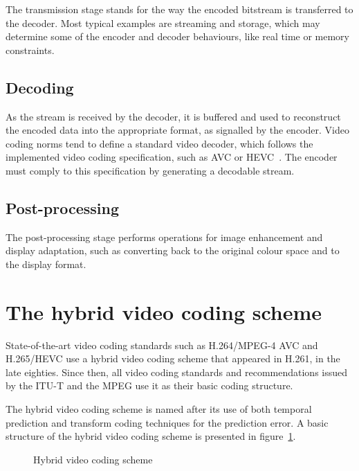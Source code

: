\documentclass[11pt,a4paper,openright,twoside]{book}
\numberwithin{equation}{section} %
\begin{document}
The transmission stage stands for the way the encoded bitstream is
transferred to the decoder.
Most typical examples are streaming and storage, which may determine
some of the encoder and decoder behaviours, like real time or memory
constraints.

\subsection{Decoding}
\label{sub:decoding}

As the stream is received by the decoder, it is buffered and used to
reconstruct the encoded data into the appropriate format, as signalled
by the encoder.
Video coding norms tend to define a standard video decoder, which
follows the implemented video coding specification, such as \ac{AVC}
or \ac{HEVC}~\cite{itu-14-h265-hevc-rec,sullivan-12-overview-hevc}.
The encoder must comply to this specification by generating a decodable
stream.

\subsection{Post-processing}
\label{sub:post_processing}

The post-processing stage performs operations for image enhancement and
display adaptation, such as converting back to the original colour
space and to the display format.

\section{The hybrid video coding scheme}
\label{sec:the_hybrid_video_coding_scheme}

State-of-the-art video coding standards such as H.264/\acs{MPEG}-4 \acs{AVC}
and H.265/\acs{HEVC} use a hybrid video coding scheme that appeared in
H.261, in the late eighties.
Since then, all video coding standards and recommendations issued by the
\ac{ITU-T} and the \ac{MPEG} use it as their basic coding structure.

The hybrid video coding scheme is named after its use of both temporal
prediction and transform coding techniques for the prediction error.
A basic structure of the hybrid video coding scheme is presented in
figure~\ref{fig:hybrid_video_coding_scheme}.

\begin{figure}[tb]
	\centering
	
	\caption{Hybrid video coding scheme}
	\label{fig:hybrid_video_coding_scheme}
\end{figure}
\end{document}
